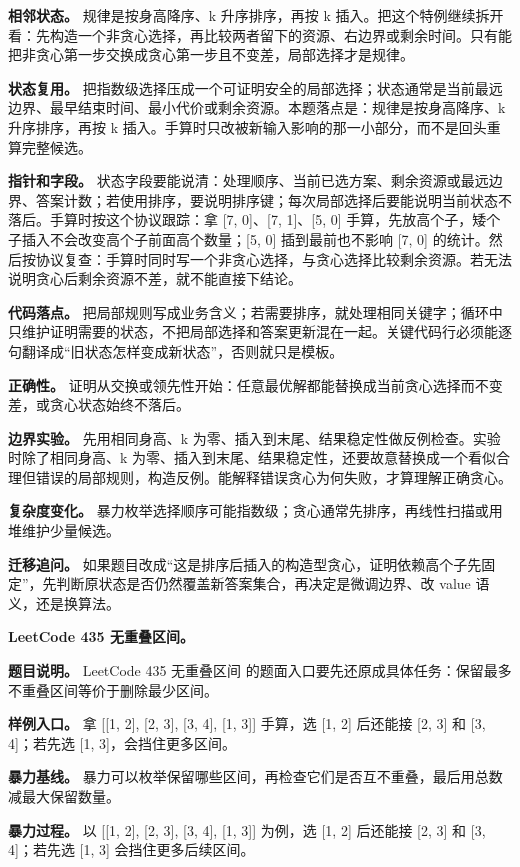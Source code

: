 \textbf{相邻状态。} 规律是按身高降序、k 升序排序，再按 k 插入。把这个特例继续拆开看：先构造一个非贪心选择，再比较两者留下的资源、右边界或剩余时间。只有能把非贪心第一步交换成贪心第一步且不变差，局部选择才是规律。

\textbf{状态复用。} 把指数级选择压成一个可证明安全的局部选择；状态通常是当前最远边界、最早结束时间、最小代价或剩余资源。本题落点是：规律是按身高降序、k 升序排序，再按 k 插入。手算时只改被新输入影响的那一小部分，而不是回头重算完整候选。

\textbf{指针和字段。} 状态字段要能说清：处理顺序、当前已选方案、剩余资源或最远边界、答案计数；若使用排序，要说明排序键；每次局部选择后要能说明当前状态不落后。手算时按这个协议跟踪：拿 [7, 0]、[7, 1]、[5, 0] 手算，先放高个子，矮个子插入不会改变高个子前面高个数量；[5, 0] 插到最前也不影响 [7, 0] 的统计。然后按协议复查：手算时同时写一个非贪心选择，与贪心选择比较剩余资源。若无法说明贪心后剩余资源不差，就不能直接下结论。

\textbf{代码落点。} 把局部规则写成业务含义；若需要排序，就处理相同关键字；循环中只维护证明需要的状态，不把局部选择和答案更新混在一起。关键代码行必须能逐句翻译成“旧状态怎样变成新状态”，否则就只是模板。

\textbf{正确性。} 证明从交换或领先性开始：任意最优解都能替换成当前贪心选择而不变差，或贪心状态始终不落后。

\textbf{边界实验。} 先用相同身高、k 为零、插入到末尾、结果稳定性做反例检查。实验时除了相同身高、k 为零、插入到末尾、结果稳定性，还要故意替换成一个看似合理但错误的局部规则，构造反例。能解释错误贪心为何失败，才算理解正确贪心。

\textbf{复杂度变化。} 暴力枚举选择顺序可能指数级；贪心通常先排序，再线性扫描或用堆维护少量候选。

\textbf{迁移追问。} 如果题目改成“这是排序后插入的构造型贪心，证明依赖高个子先固定”，先判断原状态是否仍然覆盖新答案集合，再决定是微调边界、改 value 语义，还是换算法。

\noindent\textbf{LeetCode 435 无重叠区间。}

\textbf{题目说明。} LeetCode 435 无重叠区间 的题面入口要先还原成具体任务：保留最多不重叠区间等价于删除最少区间。

\textbf{样例入口。} 拿 [[1, 2], [2, 3], [3, 4], [1, 3]] 手算，选 [1, 2] 后还能接 [2, 3] 和 [3, 4]；若先选 [1, 3]，会挡住更多区间。

\textbf{暴力基线。} 暴力可以枚举保留哪些区间，再检查它们是否互不重叠，最后用总数减最大保留数量。

\textbf{暴力过程。} 以 [[1, 2], [2, 3], [3, 4], [1, 3]] 为例，选 [1, 2] 后还能接 [2, 3] 和 [3, 4]；若先选 [1, 3] 会挡住更多后续区间。


